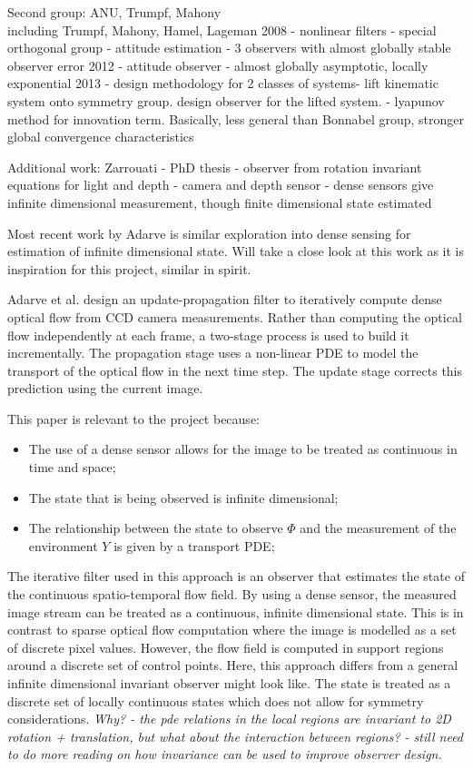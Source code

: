 Second group: ANU, Trumpf, Mahony\\
including Trumpf, Mahony, Hamel, Lageman
2008 \cite{mahony2009nonlinear} - nonlinear filters - special orthogonal group - attitude estimation - 3 observers with almost globally stable observer error
2012 \cite{trumpf2012analysis} - attitude observer - almost globally asymptotic, locally exponential
2013 \cite{mahony2013observers} - design methodology for 2 classes of systems- lift kinematic system onto symmetry group. design observer for the lifted system. - lyapunov method for innovation term. Basically, less general than Bonnabel group, stronger global convergence characteristics

Additional work:
Zarrouati \cite{zarrouati2013augmented} - PhD thesis - observer from rotation invariant equations for light and depth - camera and depth sensor - dense sensors give infinite dimensional measurement, though finite dimensional state estimated

Most recent work by Adarve \cite{adarvefiltering} is similar exploration into dense sensing for estimation of infinite dimensional state. Will take a close look at this work as it is inspiration for this project, similar in spirit.

Adarve et al. design an update-propagation filter to iteratively compute dense optical flow from CCD camera measurements. Rather than computing the optical flow independently at each frame, a two-stage process is used to build it incrementally. The propagation stage uses a non-linear PDE to model the transport of the optical flow in the next time step. The update stage corrects this prediction using the current image.

This paper is relevant to the project because:
\begin{itemize}
\item The use of a dense sensor allows for the image to be treated as continuous in time and space;
\item The state that is being observed is infinite dimensional;
\item The relationship between the state to observe $ \Phi $ and the measurement of the environment $ Y $ is given by a transport PDE;
\end{itemize}

The iterative filter used in this approach is an observer that estimates the state of the continuous spatio-temporal flow field. By using a dense sensor, the measured image stream can be treated as a continuous, infinite dimensional state. This is in contrast to sparse optical flow computation where the image is modelled as a set of discrete pixel values. However, the flow field is computed in support regions around a discrete set of control points. Here, this approach differs from a general infinite dimensional invariant observer might look like. The state is treated as a discrete set of locally continuous states which does not allow for symmetry considerations. \textit{Why? - the pde relations in the local regions are invariant to 2D rotation + translation, but what about the interaction between regions? - still need to do more reading on how invariance can be used to improve observer design.}

